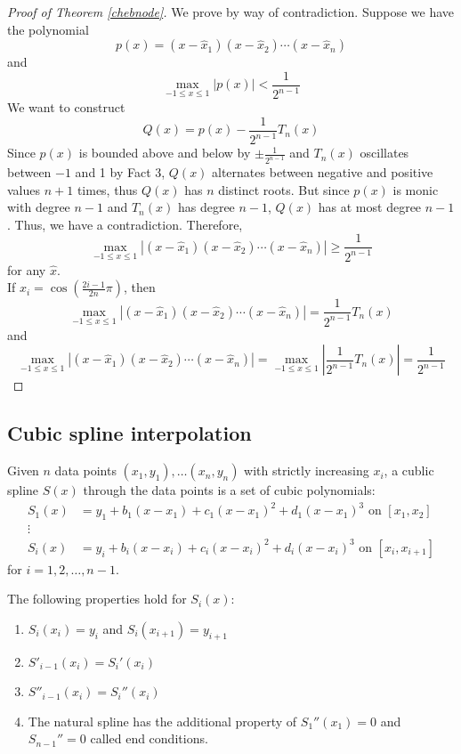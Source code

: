 \documentclass[11pt]{article}
\begin{document}
\begin{proof}[Proof of Theorem \ref{chebnode}]
    We prove by way of contradiction. Suppose we have the polynomial 
    \[
        p(x) = (x-\hat{x}_1)(x-\hat{x}_2)\cdots(x-\hat{x}_n)
    \]
    and 
    \[
        \max_{-1 \le x \le 1}|p(x)| < \frac{1}{2^{n-1}}
    \]
    We want to construct
    \[
        Q(x) = p(x) - \frac{1}{2^{n-1}}T_n(x)
    \]
    Since $p(x)$ is bounded above and below by $\pm \frac{1}{2^{n-1}}$ and $T_n(x)$ oscillates between $-1$ and 1 by Fact 3,
    $Q(x)$ alternates between negative and positive values $n+1$ times, thus $Q(x)$ has $n$ distinct roots. But since $p(x)$ is monic with degree $n-1$ and $T_n(x)$ has degree $n-1$, $Q(x)$ has at most degree $n-1$.
    Thus, we have a contradiction. Therefore,
    \[
        \max_{-1 \le x \le 1} |(x-\hat{x}_1)(x-\hat{x}_2)\cdots(x-\hat{x}_n)| \ge \frac{1}{2^{n-1}}
    \]
    for any $\hat{x}$.\\
    If $x_i = \cos(\frac{2i-1}{2n}\pi)$, then
    \[
        \max_{-1 \le x \le 1} |(x-\hat{x}_1)(x-\hat{x}_2)\cdots(x-\hat{x}_n)|  = \frac{1}{2^{n-1}}T_n(x)
    \]
    and
    \[
        \max_{-1 \le x \le 1} |(x-\hat{x}_1)(x-\hat{x}_2)\cdots(x-\hat{x}_n)| = \max_{-1 \le x \le 1} |\frac{1}{2^{n-1}}T_n(x)|  = \frac{1}{2^{n-1}} 
    \]
    
\end{proof}

\subsection{Cubic spline interpolation}
\begin{definition}
Given $n$ data points $(x_1, y_1), \dots (x_n, y_n)$ with strictly increasing $x_i$, a cublic spline $S(x)$ through the data points is a set of cubic
polynomials:
\begin{align*}
    S_1(x) &= y_1 + b_1(x-x_1)+c_1(x-x_1)^2+d_1(x-x_1)^3 \text{ on } [x_1, x_2]\\
    \vdots \\
    S_i(x) &= y_i + b_i(x-x_i)+c_i(x-x_i)^2+d_i(x-x_i)^3 \text{ on } [x_i, x_{i+1}]
\end{align*}   
for $i = 1,2,\dots, n-1$.
\end{definition}

\begin{proposition}
    The following properties hold for $S_i(x)$:
\begin{enumerate}
    \item $S_i(x_i) = y_i$ and $S_i(x_{i+1}) = y_{i+1}$
    \item $S'_{i-1}(x_i) = S_i'(x_i)$
    \item $S''_{i-1}(x_i) = S_i''(x_i)$
    \item The natural spline has the additional property of $S_1''(x_1) = 0$ and  $S_{n-1}'' = 0$ called end conditions.
\end{enumerate}    
\end{proposition}
\end{document}
